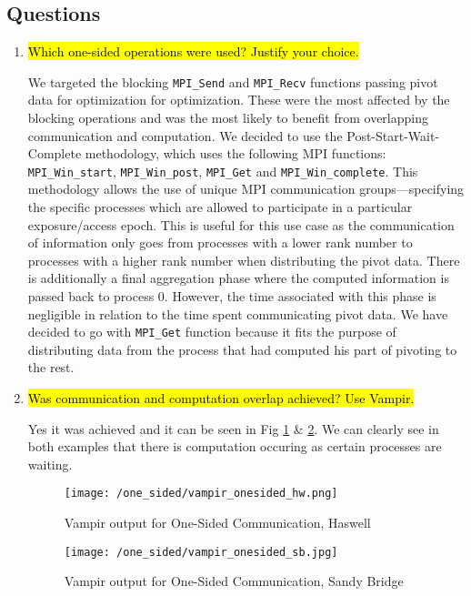 \subsection{Questions}
\begin{enumerate}
  \item \hl{Which one-sided operations were used? Justify your choice.}

	We targeted the blocking \verb!MPI_Send! and \verb!MPI_Recv! functions passing pivot data for optimization for optimization.
	These were the most affected by the blocking operations and was the most likely to benefit from overlapping communication and computation.
    We decided to use the Post-Start-Wait-Complete methodology, which uses the following 
    MPI functions: \verb!MPI_Win_start!, \verb!MPI_Win_post!, \verb!MPI_Get! and \verb!MPI_Win_complete!. 
    This methodology allows the use of unique MPI communication groups---specifying the specific processes which are allowed to participate in a particular exposure/access epoch.
    This is useful for this use case as the communication of information only goes from processes with a lower rank number to processes with a higher rank number when distributing the pivot data.
    There is additionally a final aggregation phase where the computed information is passed back to process 0.
    However, the time associated with this phase is negligible in relation to the time spent communicating pivot data.
    We have decided to go with \verb!MPI_Get! function because it fits the purpose of distributing
    data from the process that had computed his part of pivoting to the rest.

  \item \hl{Was communication and computation overlap achieved? Use Vampir.}

    Yes it was achieved and it can be seen in Fig \ref{fig:vampir_haswell_one_sided} \& \ref{fig:vampir_sandy_one_sided}. We can clearly see in both examples that there is computation occuring as certain processes are waiting.
    \begin{figure}[h] %
	\begin{center}
			\texttt{[image: /one\_sided/vampir\_onesided\_hw.png]}
		\caption{Vampir output for One-Sided Communication, Haswell}
		\label{fig:vampir_haswell_one_sided}
	\end{center}
	\end{figure}
	
	    \begin{figure}[h] %
	\begin{center}
			\texttt{[image: /one\_sided/vampir\_onesided\_sb.jpg]}
		\caption{Vampir output for One-Sided Communication, Sandy Bridge}
		\label{fig:vampir_sandy_one_sided}
	\end{center}
	\end{figure}


\end{enumerate}
